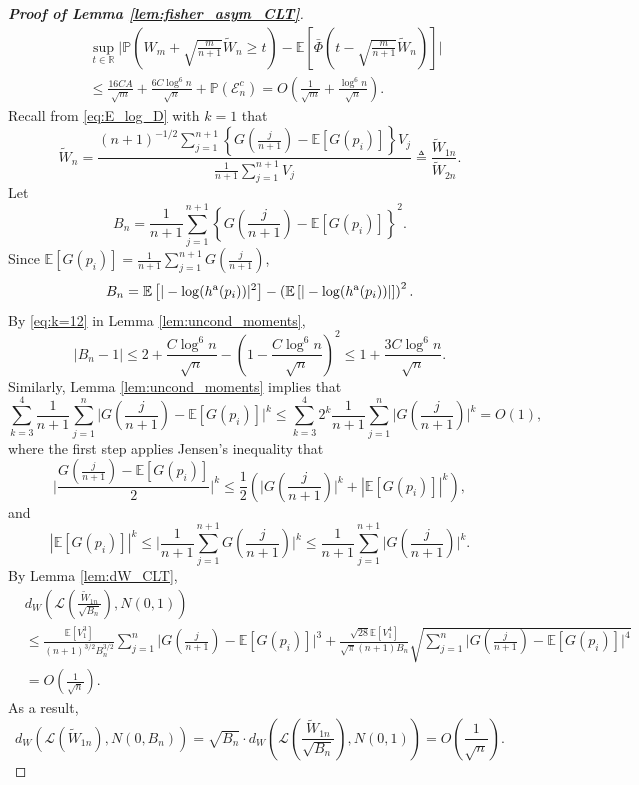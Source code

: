 \documentclass[11pt]{article}
\def\R{\mathbb{R}}
\def\E{\mathbb{E}}
\def\asym{\textnormal{a}}
\renewcommand{\P}{\mathbb{P}}
\newcommand{\event}{\mathcal{E}}
\newcommand{\lb}{\left(}
\newcommand{\rb}{\right)}
\begin{document}
\begin{proof}[\textbf{Proof of Lemma \ref{lem:fisher_asym_CLT}}]
\begin{align}
  &\sup_{t\in \R}\bigg|\P\lb W_{m} + \sqrt{\frac{m}{n+1}}\tilde{W}_{n}\ge t \rb - \E\left[\bar{\Phi}\lb t - \sqrt{\frac{m}{n+1}}\tilde{W}_{n}\rb\right]\bigg|\nonumber\\
  & \le \frac{16CA}{\sqrt{m}} + \frac{6C\log^6 n}{\sqrt{n}} + \P(\event_n^c)
    = O\lb \frac{1}{\sqrt{m}} + \frac{\log^6 n}{\sqrt{n}}\rb.
    \label{eq:P_Wm_Wn}
\end{align}
Recall from \eqref{eq:E_log_D} with $k = 1$ that
\[\tilde{W}_{n} = \frac{(n + 1)^{-1/2}\sum_{j=1}^{n+1}\left\{G\left(\frac{j}{n+1}\right) - \E[G(p_i)]\right\}V_{j}}{\frac{1}{n+1}\sum_{j=1}^{n+1}V_{j}}\triangleq \frac{\tilde{W}_{1n}}{\tilde{W}_{2n}}.\]
Let
\[B_{n} = \frac{1}{n+1}\sum_{j=1}^{n+1}\left\{G\left(\frac{j}{n+1}\right) - \E[G(p_i)]\right\}^2.\]
Since $\E[G(p_i)] = \frac{1}{n+1}\sum_{j=1}^{n+1}G\left(\frac{j}{n+1}\right)$,
\[B_{n} = \E\left[|-\log (h^\asym(p_i))|^2\right] - \lb\E\left[|-\log (h^\asym(p_i))|\right]\rb^2.\]
By \eqref{eq:k=12} in Lemma \ref{lem:uncond_moments},
\begin{equation*}
    |B_{n} - 1| \le 2 + \frac{C\log^6 n}{\sqrt{n}} - \lb 1 - \frac{C\log^6 n}{\sqrt{n}}\rb^2\le 1 + \frac{3C\log^6 n}{\sqrt{n}}.
\end{equation*}
Similarly, Lemma \ref{lem:uncond_moments} implies that
\[\sum_{k=3}^{4}\frac{1}{n+1}\sum_{j=1}^{n}\bigg|G\left(\frac{j}{n+1}\right) - \E[G(p_i)]\bigg|^k \le \sum_{k=3}^{4}2^{k}\frac{1}{n+1}\sum_{j=1}^{n}\bigg|G\left(\frac{j}{n+1}\right)\bigg|^k = O(1),\]
where the first step applies Jensen's inequality that
\[\Bigg|\frac{G\left(\frac{j}{n+1}\right) - \E[G(p_i)]}{2}\Bigg|^k\le \frac{1}{2}\lb\bigg|G\left(\frac{j}{n+1}\right)\bigg|^{k} + |\E[G(p_i)]|^k\rb,\]
and
\[|\E[G(p_i)]|^k\le \bigg|\frac{1}{n+1}\sum_{j=1}^{n+1}G\lb\frac{j}{n+1}\rb\bigg|^{k}\le \frac{1}{n+1}\sum_{j=1}^{n+1}\bigg|G\lb\frac{j}{n+1}\rb\bigg|^{k}.\]
By Lemma \ref{lem:dW_CLT},
\begin{align*}
  & d_{W}\left(\mathcal{L}\left(\frac{\tilde{W}_{1n}}{\sqrt{B_n}}\right), N(0, 1)\right)\\
  & \le \frac{\E[V_1^3]}{(n+1)^{3/2}B_n^{3/2}}\sum_{j=1}^{n}\bigg|G\left(\frac{j}{n+1}\right) - \E[G(p_i)]\bigg|^3 + \frac{\sqrt{28}\E[V_1^4]}{\sqrt{\pi}(n+1) B_n}\sqrt{\sum_{j=1}^{n}\bigg|G\left(\frac{j}{n+1}\right) - \E[G(p_i)]\bigg|^4}\\
  & = O\lb\frac{1}{\sqrt{n}}\rb.
\end{align*}
As a result,
\[d_{W}\left(\mathcal{L}(\tilde{W}_{1n}), N(0, B_n)\right) = \sqrt{B_n}\cdot d_{W}\left(\mathcal{L}\left(\frac{\tilde{W}_{1n}}{\sqrt{B_n}}\right), N(0, 1)\right) = O\lb\frac{1}{\sqrt{n}}\rb.\]

\end{proof}
\end{document}
